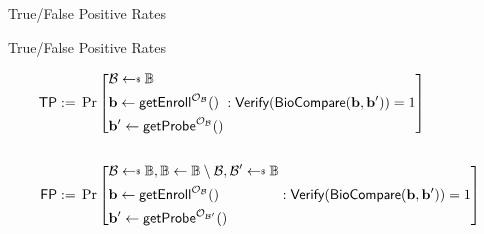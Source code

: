 \begin{frame}{True/False Positive Rates}

\begin{definition}{True/False Positive Rates}

\begin{align*}
	\textsf{TP} 
	:=&\; \Pr \left[
		\begin{aligned}
			& \mathcal{B} \getsdollar \mathbb{B} \\
			& \mathbf{b} \gets \textsf{getEnroll}^{\mathcal{O}_\mathcal{B} }() \\
			& \mathbf{b}^\prime \gets \textsf{getProbe}^{\mathcal{O}_\mathcal{B} }()
		\end{aligned}
		: \textsf{Verify}(\textsf{BioCompare}(\mathbf{b}, \mathbf{b}^\prime )) = 1 \right] \\
	\\
	\textsf{FP} 
	:=&\; \Pr \left[
		\begin{aligned}
			& \mathcal{B} \getsdollar \mathbb{B}, \mathbb{B} \gets \mathbb{B} \setminus \mathcal{B}, \mathcal{B}^\prime \getsdollar \mathbb{B} \\
			& \mathbf{b} \gets \textsf{getEnroll}^{\mathcal{O}_\mathcal{B} }() \\
			& \mathbf{b}^\prime \gets \textsf{getProbe}^{\mathcal{O}_{\mathcal{B}^\prime} }()
		\end{aligned}
		: \textsf{Verify}(\textsf{BioCompare}(\mathbf{b}, \mathbf{b}^\prime)) = 1 \right] \\
\end{align*}
\end{definition}


\end{frame}

